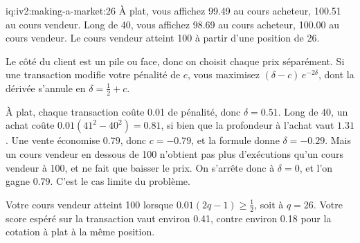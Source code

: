 \begin{solution}{iq:iv2:making-a-market:26}
À plat, vous affichez 99.49 au cours acheteur, 100.51 au cours vendeur. Long de 40, vous affichez 98.69 au cours acheteur, 100.00 au cours vendeur. Le cours vendeur atteint 100 à partir d'une position de 26.

Le côté du client est un pile ou face, donc on choisit chaque prix séparément. Si une transaction modifie votre pénalité de $c$, vous maximisez $(\delta - c)\,e^{-2\delta}$, dont la dérivée s'annule en $\delta = \tfrac12 + c$.

À plat, chaque transaction coûte 0.01 de pénalité, donc $\delta = 0.51$. Long de 40, un achat coûte $0.01(41^2 - 40^2) = 0.81$, si bien que la profondeur à l'achat vaut $1.31$. Une vente économise $0.79$, donc $c = -0.79$, et la formule donne $\delta = -0.29$. Mais un cours vendeur en dessous de 100 n'obtient pas plus d'exécutions qu'un cours vendeur à 100, et ne fait que baisser le prix. On s'arrête donc à $\delta = 0$, et l'on gagne 0.79. C'est le cas limite du problème.

Votre cours vendeur atteint 100 lorsque $0.01(2q - 1) \ge \tfrac12$, soit à $q = 26$. Votre score espéré sur la transaction vaut environ 0.41, contre environ 0.18 pour la cotation à plat à la même position.

\end{solution}

